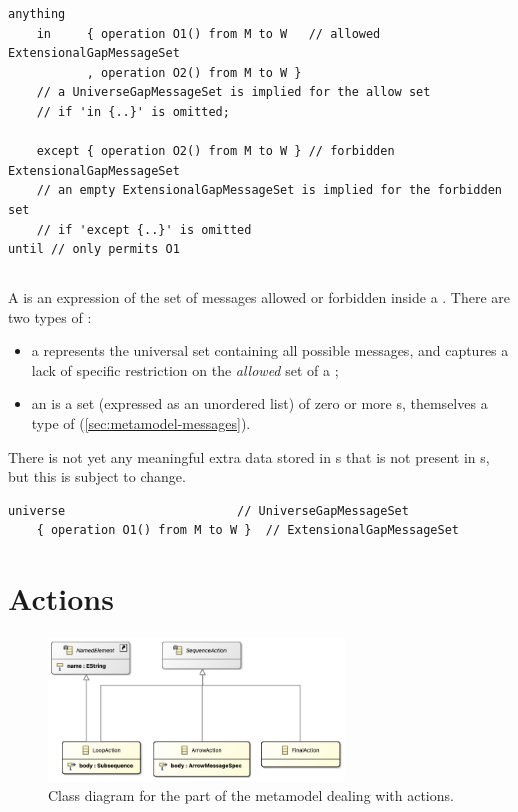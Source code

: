 \begin{lstlisting}[style=Example]
anything
    in     { operation O1() from M to W   // allowed ExtensionalGapMessageSet
           , operation O2() from M to W }
    // a UniverseGapMessageSet is implied for the allow set
    // if 'in {..}' is omitted;

    except { operation O2() from M to W } // forbidden ExtensionalGapMessageSet
    // an empty ExtensionalGapMessageSet is implied for the forbidden set
    // if 'except {..}' is omitted
until // only permits O1
\end{lstlisting}

\subsection{\mgapmessageset}\label{ssec:metamodel-sequences-gap-message-sets}

A \mgapmessageset{} is an expression of the set of messages allowed or forbidden
inside a \msequencegap.  There are two types of \mgapmessageset:

\begin{itemize}
\item
	a \muniversegapmessageset{} represents the universal set containing 
	all possible messages, and
	captures a lack of specific restriction on
	the \emph{allowed} set of a \msequencegap;
\item	
	an \mextensionalgapmessageset{} is a set (expressed as an unordered list) of
	zero or more \mgapmessagespec s, themselves
	a type of \mmessagespec{} (\cref{sec:metamodel-messages}).
\end{itemize}

There is not yet any meaningful extra data stored in
\mgapmessagespec s that is not present in \mmessagespec s, but this is subject
to change.

\begin{lstlisting}[style=Example]
    universe                        // UniverseGapMessageSet
    { operation O1() from M to W }  // ExtensionalGapMessageSet
\end{lstlisting}


\section{Actions}\label{sec:metamodel-actions}

\begin{figure}
	\centering
	\includegraphics[width=0.7\textwidth]{diagrams/actions.png}
	\caption{Class diagram for the part of the \langname{} metamodel dealing with actions.}
	\label{fig:metamodel-actions}
\end{figure}

